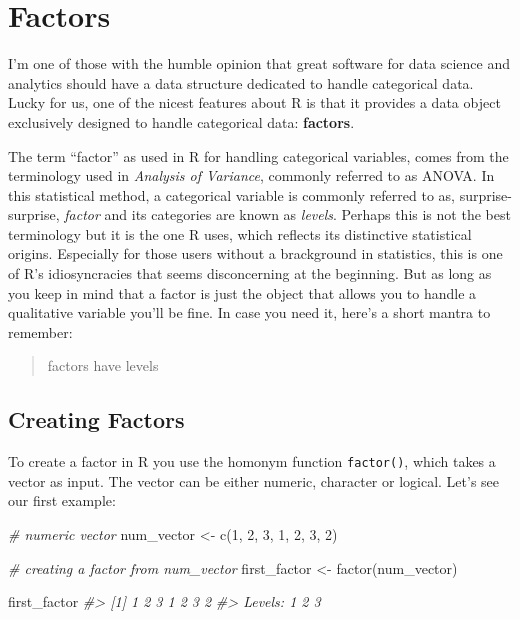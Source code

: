 \documentclass[
]{book}
\newenvironment{Shaded}{\begin{snugshade}}{\end{snugshade}}
\newcommand{\CommentTok}[1]{\textcolor[rgb]{0.56,0.35,0.01}{\textit{#1}}}
\newcommand{\DecValTok}[1]{\textcolor[rgb]{0.00,0.00,0.81}{#1}}
\newcommand{\FunctionTok}[1]{\textcolor[rgb]{0.00,0.00,0.00}{#1}}
\newcommand{\NormalTok}[1]{#1}
\newcommand{\OtherTok}[1]{\textcolor[rgb]{0.56,0.35,0.01}{#1}}
\begin{document}
\hypertarget{factors}{%
\chapter{Factors}\label{factors}}

I'm one of those with the humble opinion that great software for data science
and analytics should have a data structure dedicated to handle categorical data.
Lucky for us, one of the nicest features about R is that it provides a data
object exclusively designed to handle categorical data: \textbf{factors}.

The term ``factor'' as used in R for handling categorical variables, comes from
the terminology used in \emph{Analysis of Variance}, commonly referred to as ANOVA.
In this statistical method, a categorical variable is commonly referred to as,
surprise-surprise, \emph{factor} and its categories are known as \emph{levels}. Perhaps
this is not the best terminology but it is the one R uses, which reflects its
distinctive statistical origins. Especially for those users without a brackground
in statistics, this is one of R's idiosyncracies that seems disconcerning at
the beginning. But as long as you keep in mind that a factor is just the object
that allows you to handle a qualitative variable you'll be fine. In case you
need it, here's a short mantra to remember:

\begin{quote}
factors have levels
\end{quote}

\hypertarget{creating-factors}{%
\section{Creating Factors}\label{creating-factors}}

To create a factor in R you use the homonym function \texttt{factor()}, which takes a
vector as input. The vector can be either numeric, character or logical. Let's
see our first example:

\begin{Shaded}
\begin{Highlighting}[]
\CommentTok{\# numeric vector}
\NormalTok{num\_vector }\OtherTok{\textless{}{-}} \FunctionTok{c}\NormalTok{(}\DecValTok{1}\NormalTok{, }\DecValTok{2}\NormalTok{, }\DecValTok{3}\NormalTok{, }\DecValTok{1}\NormalTok{, }\DecValTok{2}\NormalTok{, }\DecValTok{3}\NormalTok{, }\DecValTok{2}\NormalTok{)}

\CommentTok{\# creating a factor from num\_vector}
\NormalTok{first\_factor }\OtherTok{\textless{}{-}} \FunctionTok{factor}\NormalTok{(num\_vector)}

\NormalTok{first\_factor}
\CommentTok{\#\textgreater{} [1] 1 2 3 1 2 3 2}
\CommentTok{\#\textgreater{} Levels: 1 2 3}
\end{Highlighting}
\end{Shaded}
\end{document}
